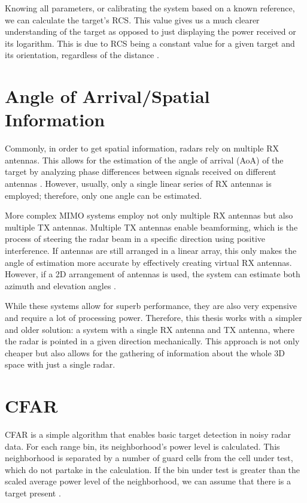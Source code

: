 Knowing all parameters, or calibrating the system based on a known reference, we can calculate the target's RCS.
This value gives us a much clearer understanding of the target as opposed to just displaying the power received or its logarithm.
This is due to RCS being a constant value for a given target and its orientation, regardless of the distance \cite{richards2022}.

\section{Angle of Arrival/Spatial Information}

Commonly, in order to get spatial information, radars rely on multiple RX antennas.
This allows for the estimation of the angle of arrival (AoA) of the target by analyzing phase differences between signals received on different antennas \cite{suleymanov2016}.
However, usually, only a single linear series of RX antennas is employed; therefore, only one angle can be estimated.

More complex MIMO systems employ not only multiple RX antennas but also multiple TX antennas.
Multiple TX antennas enable beamforming, which is the process of steering the radar beam in a specific direction using positive interference.
If antennas are still arranged in a linear array, this only makes the angle of estimation more accurate by effectively creating virtual RX antennas.
However, if a 2D arrangement of antennas is used, the system can estimate both azimuth and elevation angles \cite{sandeep2018}.

While these systems allow for superb performance, they are also very expensive and require a lot of processing power.
Therefore, this thesis works with a simpler and older solution: a system with a single RX antenna and TX antenna, where the radar is pointed in a given direction mechanically.
This approach is not only cheaper but also allows for the gathering of information about the whole 3D space with just a single radar.

\section{CFAR}


CFAR is a simple algorithm that enables basic target detection in noisy radar data.
For each range bin, its neighborhood's power level is calculated.
This neighborhood is separated by a number of guard cells from the cell under test, which do not partake in the calculation.
If the bin under test is greater than the scaled average power level of the neighborhood, we can assume that there is a target present \cite{jankiraman2018}.

